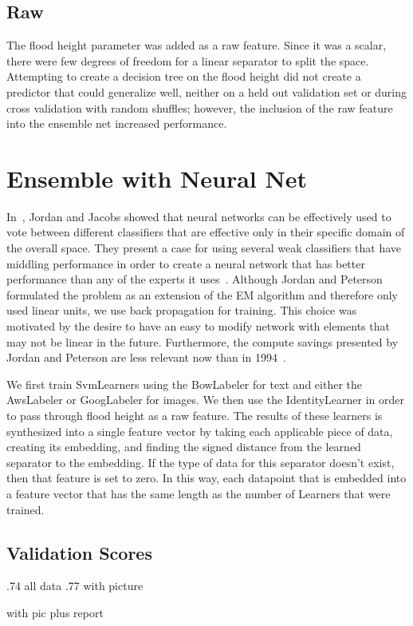 \subsection{Raw}
The flood height parameter was added as a raw feature. Since it was a scalar,
there were few degrees of freedom for a linear separator to split the space.
Attempting to create a decision tree on the flood height did not create a
predictor that could generalize well, neither on a held out validation set or
during cross validation with random shuffles; however, the inclusion of the raw
feature into the ensemble net increased performance.

\section{Ensemble with Neural Net}
In~\cite{jordanHierarchicalMixturesExperts1994}, Jordan and Jacobs showed that
neural networks can be effectively used to vote between different classifiers
that are effective only in their specific domain of the overall space. They present a
case for using several weak classifiers that have middling performance in order
to create a neural network that has better performance than any of the experts
it uses~\cite{jordanHierarchicalMixturesExperts1994}. Although Jordan and
Peterson formulated the problem as an extension of the EM algorithm and
therefore only used linear units, we use back propagation for training. This
choice was motivated by the desire to have an easy to modify network with
elements that may not be linear in the future. Furthermore, the compute savings
presented by Jordan and Peterson are less relevant now than in 1994~\cite{bishopPatternRecognitionMachine2006}.

We first train SvmLearners using the BowLabeler for text and either the AwsLabeler or
GoogLabeler for images. We then use the IdentityLearner in order to pass through
flood height as a raw feature. The results of these learners is synthesized into
a single feature vector by taking each applicable piece of data, creating its
embedding, and finding the signed distance from the learned separator to the
embedding. If the type of data for this separator doesn't exist, then that
feature is set to zero. In this way, each datapoint that is embedded into a
feature vector that has the same length as the number of Learners that were
trained.


\subsection{Validation Scores}
.74 all data 
.77 with picture
 
 with pic plus report 


